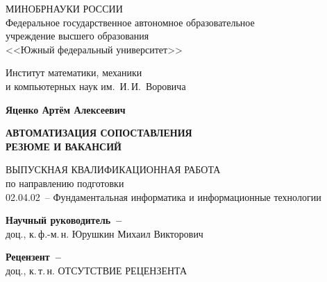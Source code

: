 


\thispagestyle{empty}
\begin{singlespacing}
    \begin{center}

        МИНОБРНАУКИ РОССИИ\\ [12pt]
        Федеральное государственное автономное образовательное\\
        учреждение высшего образования\\
        <<Южный федеральный университет>>

        \vspace{\baselineskip}
        Институт математики, механики\\
        и компьютерных наук им.~И.\,И.~Воровича


        \vfill
        \textbf{Яценко Артём Алексеевич}

        \vspace{15mm}
        {\bf АВТОМАТИЗАЦИЯ СОПОСТАВЛЕНИЯ \\
            РЕЗЮМЕ И ВАКАНСИЙ}

        \vspace{15mm}
        ВЫПУСКНАЯ КВАЛИФИКАЦИОННАЯ РАБОТА\\
        по направлению подготовки\\
        02.04.02~-- Фундаментальная информатика и информационные технологии

        \vspace{10mm}
        \textbf{Научный руководитель~--}\\
        доц., к.\,ф.-м.\,н. Юрушкин Михаил Викторович

        \vspace{7mm}
        \textbf{Рецензент~--}\\
        доц., к.\,т.\,н. ОТСУТСТВИЕ РЕЦЕНЗЕНТА



\end{center}
\end{singlespacing}
